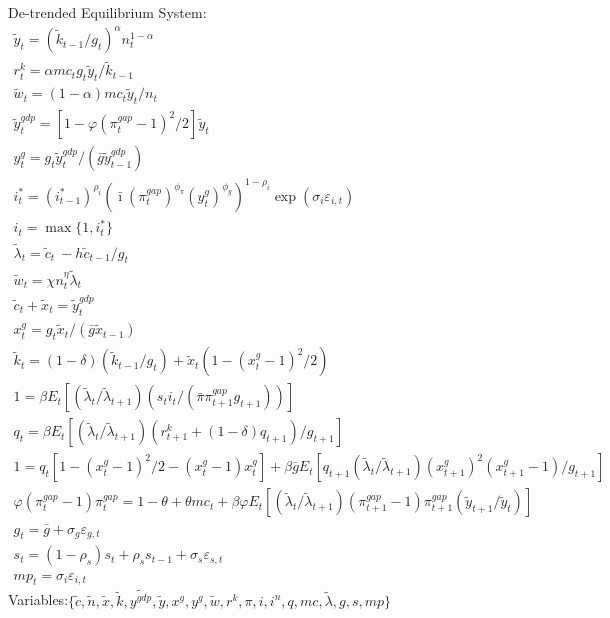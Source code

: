 \documentclass[12pt, final]{article}
\begin{document}
\setcounter{equation}{0}
\noindent De-trended Equilibrium System:
\small\begin{gather}
\tilde{y}_t= (\tilde{k}_{t-1}/g_t)^\alpha n_t^{1-\alpha}\\
r^k_t = \alpha mc_t g_t \tilde{y}_t/\tilde{k}_{t-1}\\
\tilde{w}_t = (1-\alpha)mc_t\tilde{y}_t/n_t\\
\tilde{y}^{gdp}_t = [1-\varphi(\pi_t^{gap} - 1)^2/2]\tilde{y}_t\\
y^g_t = g_t\tilde{y}^{gdp}_t/(\bar{g}\tilde{y}^{gdp}_{t-1})\\
i_t^*=(i^*_{t-1})^{\rho_i}(\bar{\imath}(\pi_t^{gap})^{\phi_\pi}(y^g_t)^{\phi_y})^{1-\rho_i}\exp(\sigma_i\varepsilon_{i,t})\\
i_t=\max\{1,i_t^*\}\\
\tilde{\lambda}_t = \tilde{c}_t\ - h\tilde{c}_{t-1}/g_t\\
\tilde{w}_t = \chi n_t^\eta \tilde{\lambda}_t  \\
\tilde{c}_t + \tilde{x}_t = \tilde{y}^{gdp}_t\\
x^g_t = g_t\tilde{x}_t/(\bar{g}\tilde{x}_{t-1})\\
\tilde{k}_t = (1-\delta)(\tilde{k}_{t-1}/g_t) + \tilde{x}_t(1-(x^g_t-1)^2/2)\\%
  1 = \beta E_t[(\tilde{\lambda}_t/\tilde{\lambda}_{t+1})(s_ti_t/(\bar{\pi}\pi_{t+1}^{gap}g_{t+1}))]\\
q_t = \beta E_t[(\tilde{\lambda}_t/\tilde{\lambda}_{t+1})(r^k_{t+1} + (1-\delta)q_{t+1})/g_{t+1}]\\
1 = q_t[1 - (x^g_t-1)^2/2 - (x^g_t-1)x^g_t] + \beta\bar{g}E_t[q_{t+1}(\tilde{\lambda}_t/\tilde{\lambda}_{t+1})(x^g_{t+1})^2(x^g_{t+1}-1)/g_{t+1}]\\
  \varphi(\pi_t^{gap}-1){\pi}_t^{gap} = 1-\theta + \theta mc_t + \beta\varphi E_t[(\tilde{\lambda}_t/\tilde{\lambda}_{t+1}) (\pi_{t+1}^{gap}-1)\pi_{t+1}^{gap}(\tilde{y}_{t+1}/\tilde{y}_t)]\\
  g_t= \bar{g} + \sigma_g\varepsilon_{g,t} \\
  s_t=(1-\rho_s)s_t+\rho_ss_{t-1} + \sigma_s\varepsilon_{s,t}\\
  mp_t = \sigma_i\varepsilon_{i,t}
\end{gather}
Variables:$\{\tilde{c},\tilde{n},\tilde{x},\tilde{k},\tilde{y^{gdp}},\tilde{y},x^g,y^g,\tilde{w},r^k,\pi,i,i^n,q,mc,\tilde{\lambda},g,s,mp\}$\\
\end{document}
